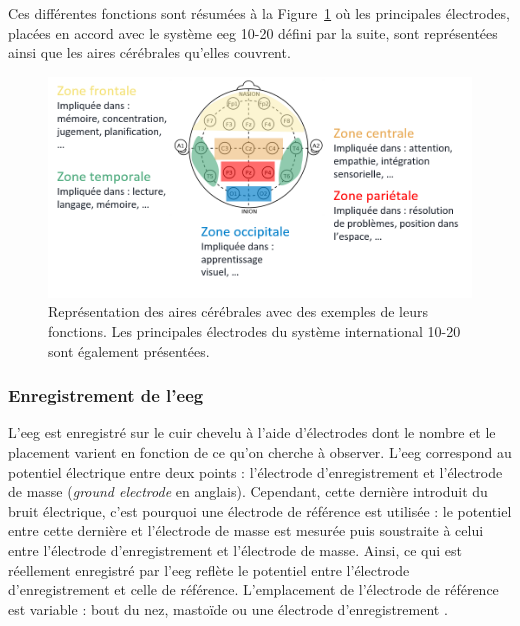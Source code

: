 Ces différentes fonctions sont résumées à la Figure~\ref{Figure:introduction_cortical_areas_and_functions} où les principales électrodes, placées en accord avec le système \gls{eeg} 10-20 
défini par la suite, sont représentées ainsi que les aires cérébrales qu'elles couvrent. 

\begin{figure}[h!]
  \centering
	\includegraphics[width=1\linewidth]{figures/chapter-1/introduction-cortical-areas-and-functions} 
  \caption[Représentation des aires cérébrales avec des exemples de leurs fonctions.]{Représentation des aires cérébrales avec des exemples de leurs fonctions. 
	Les principales électrodes du système international 10-20 sont également présentées.}
  \label{Figure:introduction_cortical_areas_and_functions}
\end{figure}

\subsubsection{Enregistrement de l'\gls{eeg}}

L'\gls{eeg} est enregistré sur le cuir chevelu à l'aide d'électrodes dont le nombre et le placement varient en fonction de ce qu'on cherche à observer. L'\gls{eeg} correspond
au potentiel électrique entre deux points : l'électrode d'enregistrement et l'électrode de masse (\textit{ground electrode} en anglais). Cependant, cette dernière introduit
du bruit électrique, c'est pourquoi une électrode de référence est utilisée : le potentiel entre cette dernière et l'électrode de masse est mesurée puis soustraite à celui entre
l'électrode d'enregistrement et l'électrode de masse. Ainsi, ce qui est réellement enregistré par l'\gls{eeg} reflète le potentiel entre l'électrode d'enregistrement et celle
de référence. L'emplacement de l'électrode de référence est variable : bout du nez, mastoïde ou une électrode d'enregistrement \citep{Michel2004}.

